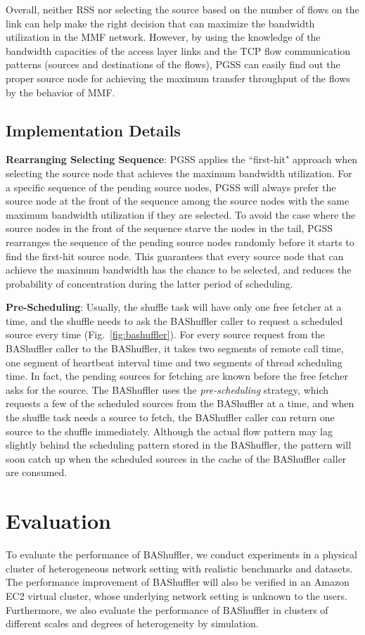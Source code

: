 \documentclass[10pt,journal,compsoc]{IEEEtran}
\begin{document}
Overall, neither RSS nor selecting the source based on the number of flows on
the link can help make the right decision that can
maximize the bandwidth utilization in the MMF network.
However, by using the knowledge
of the bandwidth capacities of the
access layer links and the TCP flow communication patterns (sources
and destinations of the flows),
PGSS can easily find out the proper source node for achieving the maximum
transfer throughput of the flows by
the behavior of MMF.


\subsection{Implementation Details}
\textbf{Rearranging Selecting Sequence}: PGSS applies the ``first-hit" approach when selecting the source node that achieves the maximum bandwidth utilization. 
For a specific sequence of the pending source nodes, PGSS will always
prefer the source node at the front of the sequence
among the source nodes with the same maximum bandwidth utilization
if they are selected.
To avoid the case where the source nodes in the front
of the sequence starve the nodes in the tail,
PGSS rearranges the sequence of the pending source nodes randomly
before it starts to find the first-hit source node.
This guarantees that every source node that can achieve the maximum
bandwidth has the chance to be selected, and
reduces the probability of concentration during the latter period of
scheduling.

\textbf{Pre-Scheduling}:
Usually, the shuffle task will have only one free fetcher at a time,
and the shuffle needs to ask the BAShuffler caller
to request a scheduled source every time (Fig.~\ref{fig:bashuffler}). 
For every source request from the BAShuffler caller to the BAShuffler, 
it takes two segments of remote call time, one segment of heartbeat
interval time and two segments of thread scheduling time.
In fact, the pending sources for fetching are known before the free
fetcher asks for the source.
The BAShuffler uses the \emph{pre-scheduling} strategy, which requests
a few of the scheduled sources from the BAShuffler at a time,
and when the shuffle task needs a source to fetch, the BAShuffler
caller can return one source to the shuffle
immediately. Although the actual flow pattern may lag slightly behind
the scheduling pattern stored in the BAShuffler,
the pattern will soon catch up when the scheduled sources in the cache of
the BAShuffler caller are consumed.


\section{Evaluation}\label{section:evaluation}
To evaluate the performance of BAShuffler, 
we conduct experiments in a physical cluster of heterogeneous
network setting with realistic benchmarks and datasets.
The performance improvement of BAShuffler will also be verified in an
Amazon EC2 virtual cluster, whose underlying network setting is
unknown to the users.
Furthermore, we also evaluate the performance of BAShuffler in
clusters of different scales and degrees of heterogeneity by simulation.
\end{document}
